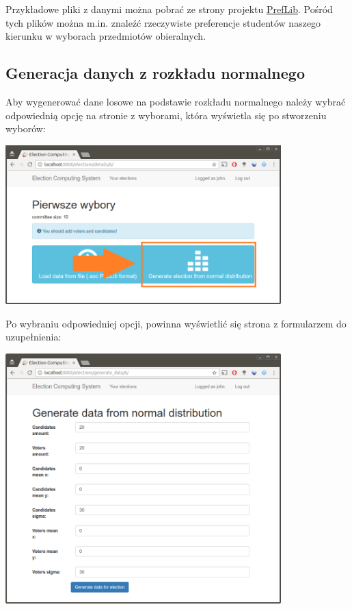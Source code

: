 \documentclass[pdflatex,11pt]{../aghdoc_version2}
\begin{document}
Przykładowe pliki z danymi można pobrać ze strony projektu \href{http://www.preflib.org/data/packs/index.php#soc}{PrefLib}. Pośród tych plików można m.in. znaleźć rzeczywiste preferencje studentów naszego kierunku w wyborach przedmiotów obieralnych.

\subsection{Generacja danych z rozkładu normalnego}
\label{subsec:generowaniedanych}

Aby wygenerować dane losowe na podstawie rozkładu normalnego należy wybrać odpowiednią opcję na stronie z wyborami, która wyświetla się po stworzeniu wyborów: \\

\begin{center}
\includegraphics[width=0.8\textwidth]{pics/generate_election_button.png}
\end{center}

\newpage
Po wybraniu odpowiedniej opcji, powinna wyświetlić się strona z formularzem do uzupełnienia: \\

\begin{center}
\includegraphics[width=0.8\textwidth]{pics/generate-distribution.png}
\end{center}
\end{document}
